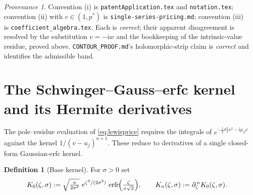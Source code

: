 \documentclass[11pt]{article}
\DeclareMathOperator{\erfc}{erfc}
\newcommand{\Ii}{\mathrm{i}}
\theoremstyle{plain}
\theoremstyle{definition}
\newtheorem{definition}[theorem]{Definition}
\theoremstyle{remark}
\newtheorem*{provenance}{Provenance}
\begin{document}
\begin{provenance}
Convention (i) is \texttt{patentApplication.tex} and \texttt{notation.tex};
convention (ii) with $c\in(1,p^\ast)$ is \texttt{single-series-pricing.md};
convention (iii) is \texttt{coefficient\_algebra.tex}. Each is \emph{correct};
their apparent disagreement is resolved by the substitution $v=-\Ii w$ and the
bookkeeping of the intrinsic-value residue, proved above. \texttt{CONTOUR\_PROOF.md}'s
holomorphic-strip claim is \emph{correct} and identifies the admissible band.
\end{provenance}

\section{The Schwinger--Gauss--erfc kernel and its Hermite derivatives}
\label{sec:kernel}

The pole--residue evaluation of \eqref{eq:lewisprice} requires the integrals of
$e^{-\frac12\sigma_T^2v^2-\Ii\mu_Tv}$ against the kernel $1/(v-u_j)^{n+1}$. These
reduce to derivatives of a single closed-form Gaussian-erfc kernel.

\begin{definition}[Base kernel]\label{def:kernel}
For $\sigma>0$ set
\begin{equation}\label{eq:K0}
   K_0(\zeta,\sigma):=\sqrt{\tfrac{\pi}{2\sigma^2}}\;
      e^{\zeta^2/(2\sigma^2)}\,\erfc\!\Bigl(\tfrac{\zeta}{\sigma\sqrt2}\Bigr),
   \qquad
   K_n(\zeta,\sigma):=\partial_\zeta^{\,n}K_0(\zeta,\sigma).
\end{equation}
\end{definition}
\end{document}
